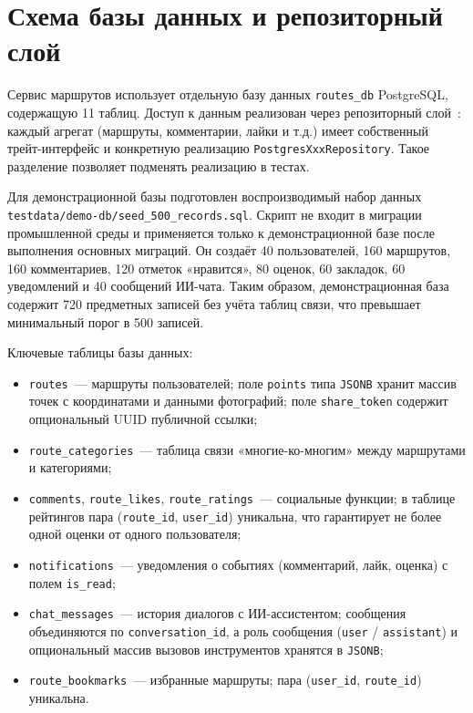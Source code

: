 \section{Схема базы данных и репозиторный слой}
\label{sec:db-repository}

Сервис маршрутов использует отдельную базу данных \texttt{routes\_db} PostgreSQL, содержащую 11 таблиц. Доступ к данным реализован через репозиторный слой~\cite{fowler2018}: каждый агрегат (маршруты, комментарии, лайки и т.д.) имеет собственный трейт-интерфейс и конкретную реализацию \texttt{PostgresXxxRepository}. Такое разделение позволяет подменять реализацию в тестах.

Для демонстрационной базы подготовлен воспроизводимый набор данных \texttt{testdata/demo-db/seed\_500\_records.sql}. Скрипт не входит в миграции промышленной среды и применяется только к демонстрационной базе после выполнения основных миграций. Он создаёт 40 пользователей, 160 маршрутов, 160 комментариев, 120 отметок «нравится», 80 оценок, 60 закладок, 60 уведомлений и 40 сообщений ИИ-чата. Таким образом, демонстрационная база содержит 720 предметных записей без учёта таблиц связи, что превышает минимальный порог в 500 записей.

Ключевые таблицы базы данных:
\begin{itemize}
  \item \texttt{routes}~--- маршруты пользователей; поле \texttt{points} типа \texttt{JSONB} хранит массив точек с координатами и данными фотографий; поле \texttt{share\_token} содержит опциональный UUID публичной ссылки;
  \item \texttt{route\_categories}~--- таблица связи «многие-ко-многим» между маршрутами и категориями;
  \item \texttt{comments}, \texttt{route\_likes}, \texttt{route\_ratings}~--- социальные функции; в таблице рейтингов пара (\texttt{route\_id}, \texttt{user\_id}) уникальна, что гарантирует не более одной оценки от одного пользователя;
  \item \texttt{notifications}~--- уведомления о событиях (комментарий, лайк, оценка) с полем \texttt{is\_read};
  \item \texttt{chat\_messages}~--- история диалогов с ИИ-ассистентом; сообщения объединяются по \texttt{conversation\_id}, а роль сообщения (\texttt{user} / \texttt{assistant}) и опциональный массив вызовов инструментов хранятся в \texttt{JSONB};
  \item \texttt{route\_bookmarks}~--- избранные маршруты; пара (\texttt{user\_id}, \texttt{route\_id}) уникальна.
\end{itemize}

